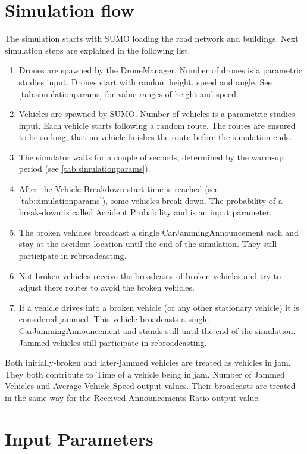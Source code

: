 \documentclass[]{nsm-thesis}
\begin{document}
\section {Simulation flow}

The simulation starts with SUMO loading the road network and buildings. Next simulation steps are explained in the following list.

\begin{enumerate}
	\item Drones are spawned by the DroneManager. Number of drones is a parametric studies input. Drones start with random height, speed and angle. See \cref{tab:simulationparams} for value ranges of height and speed.
	\item Vehicles are spawned by SUMO. Number of vehicles is a parametric studies input. Each vehicle starts following a random route. The routes are ensured to be so long, that no vehicle finishes the route before the simulation ends.
	\item The simulator waits for a couple of seconds, determined by the warm-up period (see \cref{tab:simulationparams}).
	\item After the Vehicle Breakdown start time is reached (see \cref{tab:simulationparams}), some vehicles break down. The probability of a break-down is called Accident Probability and is an input parameter.
  	\item The broken vehicles broadcast a single CarJammingAnnouncement each and stay at the accident location until the end of the simulation. They still participate in rebroadcasting.
	\item Not broken vehicles receive the broadcasts of broken vehicles and try to adjust there routes to avoid the broken vehicles.
	\item If a vehicle drives into a broken vehicle (or any other stationary vehicle) it is considered jammed. This vehicle broadcasts a single CarJammingAnnouncement and stands still until the end of the simulation. Jammed vehicles still participate in rebroadcasting.
\end{enumerate}

Both initially-broken and later-jammed vehicles are treated as vehicles in jam. They both contribute to Time of a vehicle being in jam, Number of Jammed Vehicles and Average Vehicle Speed output values. Their broadcasts are treated in the same way for the Received Announcements Ratio output value. 



\section{Input Parameters}
\end{document}

